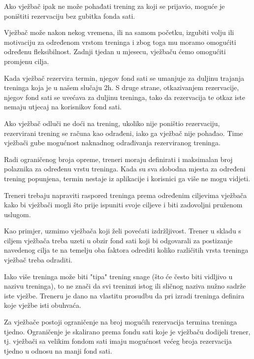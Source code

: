         {Ako vježbač ipak ne može pohađati trening za koji se prijavio, moguće je poništiti rezervaciju bez gubitka fonda sati.\\}
        
        {Vježbač može nakon nekog vremena, ili na samom početku, izgubiti volju ili motivaciju za određenom vrstom treninga i zbog toga mu moramo omogućiti određenu fleksibilnost. Zadnji tjedan u mjesecu, vježbaču ćemo omogućiti promjenu cilja.}
        
        {Kada vježbač rezervira termin, njegov fond sati se umanjuje za duljinu trajanja treninga koja je u našem slučaju 2h. S druge strane, otkazivanjem rezervacije, njegov fond sati se uvećava za duljinu treninga, tako da rezervacija te otkaz iste nemaju utjecaj na korisnikov fond sati.\\}
		
		{Ako vježbač odluči ne doći na trening, ukoliko nije poništio rezervaciju, rezervirani trening se računa kao odrađeni, iako ga vježbač nije pohađao. Time vježbači gube mogućnost naknadnog odrađivanja rezerviranog treninga.\\}
		
		
		{Radi ograničenog broja opreme, treneri moraju definirati i maksimalan broj polaznika za određenu vrstu treninga. Kada su sva slobodna mjesta za određeni trening popunjena, termin nestaje iz aplikacije i korisnici ga više ne mogu vidjeti.\\}
		
		{Treneri trebaju napraviti raspored treninga prema određenim ciljevima vježbača kako bi vježbači mogli što prije ispuniti svoje ciljeve i biti zadovoljni pruženom uslugom.\\}
		
		{Kao primjer, uzmimo vježbača koji želi povećati izdržljivost. Trener u skladu s ciljem vježbača treba uzeti u obzir fond sati koji bi odgovarali za postizanje navedenog cilja te na temelju oba faktora odrediti koliko različitih vrsta treninga vježbač treba odraditi.\\}
		
		
		{Iako više treninga može biti "tipa" trening snage (što će često biti vidljivo u nazivu treninga), to ne znači da svi treninzi istog ili sličnog naziva nužno sadrže iste vježbe. Treneru je dano na vlastitu prosudbu da pri izradi treninga definira koje vježbe isti obuhvaća. \\}


        {Za vježbače postoji ograničenje na broj mogućih rezervacija termina treninga tjedno. Ograničenje je skalirano prema fondu sati koje je vježbaču dodijeli trener, tj. vježbači sa velikim fondom sati imaju mogućnost većeg broja rezervacija tjedno u odnosu na manji fond sati. \\}
		
